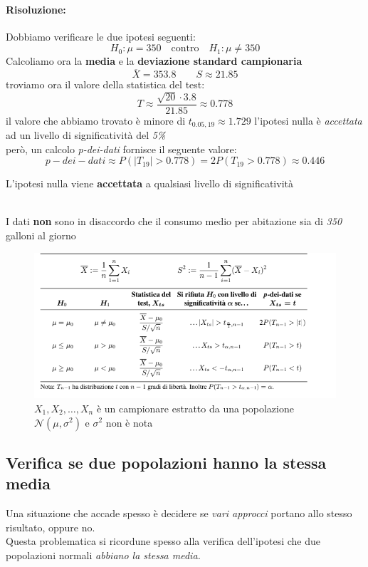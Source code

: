 \documentclass[]{article}
\begin{document}
    \paragraph{Risoluzione:}
    Dobbiamo verificare le due ipotesi seguenti:
    \[ H_0 : \mu = 350 \quad \text{contro} \quad H_1 : \mu \not = 350 \]
    Calcoliamo ora la \textbf{media} e la \textbf{deviazione standard campionaria}
    \[ \overline{X} = 353.8 \qquad S \approx 21.85 \]
    troviamo ora il valore della statistica del test:
    \[ T \approx \frac{\sqrt{20} \cdot 3.8}{21.85} \approx \boldsymbol{0.778} \]
    il valore che abbiamo trovato è minore di $t_{0.05, 19} \approx 1.729$ l'ipotesi nulla è \textit{accettata} ad un livello di significatività del \textit{5\%} \\
    però, un calcolo \textit{p-dei-dati} fornisce il seguente valore:
    \[ p-dei-dati \approx P(|T_{19}| > 0.778) = 2 P(T_{19} > 0.778) \approx 0.446 \]
    \centerline{L'ipotesi nulla viene \textbf{accettata} a qualsiasi livello di significatività} \\[3ex]
    I dati \textbf{non} sono in disaccordo che il consumo medio per abitazione sia di \textit{350} galloni al giorno
    \begin{figure}[H]
        \caption{$X_1, X_2, \ldots, X_n$ è un campionare estratto da una popolazione $\mathcal{N}(\mu, \sigma^2)$ e $\sigma^2$ non è nota}
        \includegraphics[width=\textwidth]{images/boh_9.png}
    \end{figure}
    \subsection{Verifica se due popolazioni hanno la stessa media}
    Una situazione che accade spesso è decidere se \textit{vari approcci} portano allo stesso risultato, oppure no. \\
    Questa problematica si ricordune spesso alla verifica dell'ipotesi che due popolazioni normali \textit{abbiano la stessa media.}
\end{document}
